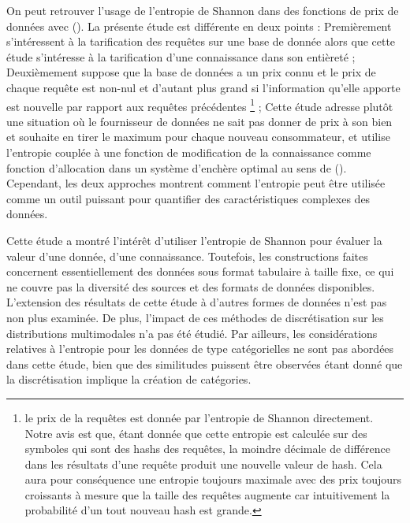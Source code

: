 On peut retrouver l'usage de l'entropie de Shannon dans des fonctions de prix de données avec \citeauthor{deep_qirana_2017} (\citeyear{deep_qirana_2017}). La présente étude est différente en deux points : Premièrement \citeauthor{deep_qirana_2017} s'intéressent à la tarification des requêtes sur une base de donnée alors que cette étude s'intéresse à la tarification d'une connaissance dans son entièreté ; Deuxièmement \citeauthor{deep_qirana_2017} suppose que la base de données a un prix connu et le prix de chaque requête est non-nul et d'autant plus grand si l'information qu'elle apporte est nouvelle par rapport aux requêtes précédentes \footnote{le prix de la requêtes est donnée par l'entropie de Shannon directement. Notre avis est que, étant donnée que cette entropie est calculée sur des symboles qui sont des hashs des requêtes, la moindre décimale de différence dans les résultats d'une requête produit une nouvelle valeur de hash. Cela aura pour conséquence une entropie toujours maximale avec des prix toujours croissants à mesure que la taille des requêtes augmente car intuitivement la probabilité d'un tout nouveau hash est grande.} ; Cette étude adresse plutôt une situation où le fournisseur de données ne sait pas donner de prix à son bien et souhaite en tirer le maximum pour chaque nouveau consommateur, et utilise l'entropie couplée à une fonction de modification de la connaissance comme fonction d'allocation dans un système d'enchère optimal au sens de \citeauthor{myerson_optimal_1981}(\citeyear{myerson_optimal_1981}). Cependant, les deux approches montrent comment l'entropie peut être utilisée comme un outil puissant pour quantifier des caractéristiques complexes des données.

Cette étude a montré l'intérêt d'utiliser l'entropie de Shannon pour évaluer la valeur d'une donnée, d'une connaissance. Toutefois, les constructions faites concernent essentiellement des données sous format tabulaire à taille fixe, ce qui ne couvre pas la diversité des sources et des formats de données disponibles. L'extension des résultats de cette étude à d'autres formes de données n'est pas non plus examinée. De plus, l'impact de ces méthodes de discrétisation sur les distributions multimodales n'a pas été étudié. Par ailleurs, les considérations relatives à l'entropie pour les données de type catégorielles ne sont pas abordées dans cette étude, bien que des similitudes puissent être observées étant donné que la discrétisation implique la création de catégories.


